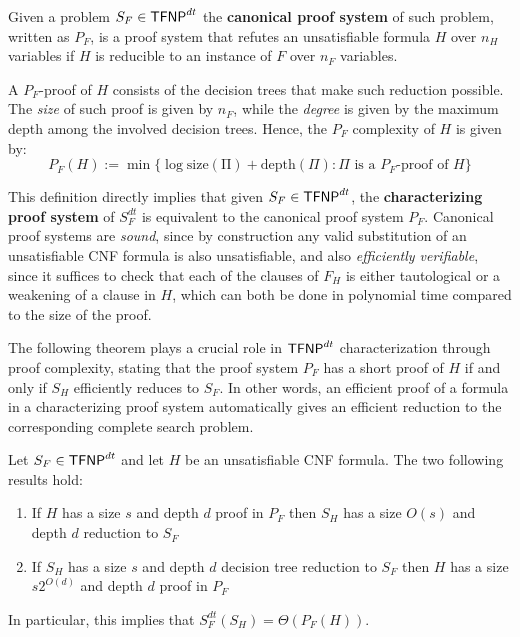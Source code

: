 \begin{definition}
 Given a problem $S_F \in \mathsf{TFNP}^{dt}$ the \textbf{canonical proof system} of such problem, written as $P_F$, is a proof system that refutes an unsatisfiable formula $H$ over $n_H$ variables if $H$ is reducible to an instance of $F$ over $n_F$ variables. 
\end{definition} 

A $P_F$-proof of $H$ consists of the decision trees that make such reduction possible. The \textit{size} of such proof is given by $n_F$, while the \textit{degree} is given by the maximum depth among the involved decision trees. Hence, the $P_F$ complexity of $H$ is given by:
    \[P_F(H) := \min\{\log \mathrm{size(\Pi)}+ \mathrm{depth}(\Pi) : \Pi \text{ is a $P_F$-proof of } H\}\]

This definition directly implies that given $S_F \in \mathsf{TFNP}^{dt}$, the \textbf{characterizing proof system} of $S_F^{dt}$ is equivalent to the canonical proof system $P_F$. Canonical proof systems are \textit{sound}, since by construction any valid substitution of an unsatisfiable CNF formula is also unsatisfiable, and also \textit{efficiently verifiable}, since it suffices to check that each of the clauses of $F_H$ is either tautological or a weakening of a clause in $H$, which can both be done in polynomial time compared to the size of the proof.

The following theorem plays a crucial role in $\mathsf{TFNP}^{dt}$ characterization through proof complexity, stating that the proof system $P_F$ has a short proof of $H$ if and only if $S_H$ efficiently reduces to $S_F$. In other words, an efficient proof of a formula in a characterizing proof system automatically gives an efficient reduction to the corresponding complete search problem.

\begin{theorem}
    \label{equiv_proof}
 Let $S_F \in \mathsf{TFNP}^{dt}$ and let $H$ be an unsatisfiable CNF formula. The two following results hold:
    \begin{enumerate}
        \item If $H$ has a size $s$ and depth $d$ proof in $P_F$ then $S_H$ has a size $O(s)$ and depth $d$ reduction to $S_F$
        \item If $S_H$ has a size $s$ and depth $d$ decision tree reduction to $S_F$ then $H$ has a size $s2^{O(d)}$ and depth $d$ proof in $P_F$
    \end{enumerate}
 In particular, this implies that $S_F^{dt}(S_H) = \Theta(P_F(H))$.
\end{theorem}


